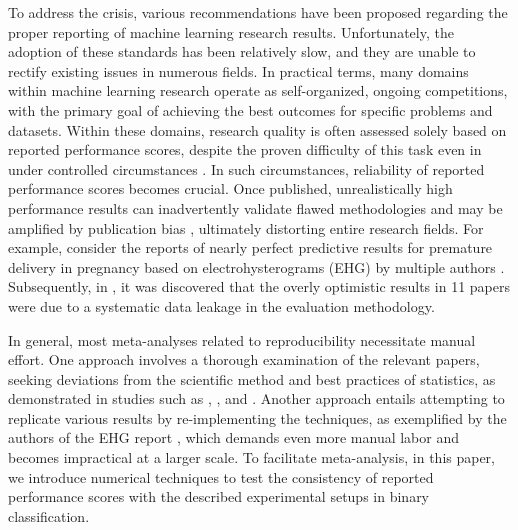 \documentclass[3p, times]{elsarticle}
\begin{document}
To address the crisis, various recommendations have been proposed \cite{repr0, repr2} regarding the proper reporting of machine learning research results. Unfortunately, the adoption of these standards has been relatively slow, and they are unable to rectify existing issues in numerous fields.
In practical terms, many domains within machine learning research operate as self-organized, ongoing competitions, with the primary goal of achieving the best outcomes for specific problems and datasets. Within these domains, research quality is often assessed solely based on reported performance scores, despite the proven difficulty of this task even in under controlled circumstances \cite{ranking}. In such circumstances, reliability of reported performance scores becomes crucial. Once published, unrealistically high performance results can inadvertently validate flawed methodologies and may be amplified by publication bias \cite{publicationbias}, ultimately distorting entire research fields.
 For example, consider the reports of nearly perfect predictive results for premature delivery in pregnancy based on electrohysterograms (EHG) by multiple authors \cite{ehgreview}. Subsequently, in \cite{ehg}, it was discovered that the overly optimistic results in 11 papers were due to a systematic data leakage in the evaluation methodology.

In general, most meta-analyses \cite{metaresearch} related to reproducibility necessitate manual effort. One approach involves a thorough examination of the relevant papers, seeking deviations from the scientific method and best practices of statistics, as demonstrated in studies such as \cite{psychiatry}, \cite{csecurity}, and \cite{satellite}. Another approach entails attempting to replicate various results by re-implementing the techniques, as exemplified by the authors of the EHG report \cite{ehg}, which demands even more manual labor and becomes impractical at a larger scale.
 To facilitate meta-analysis, in this paper, we introduce numerical techniques to test the consistency of reported performance scores with the described experimental setups in binary classification.
\end{document}

